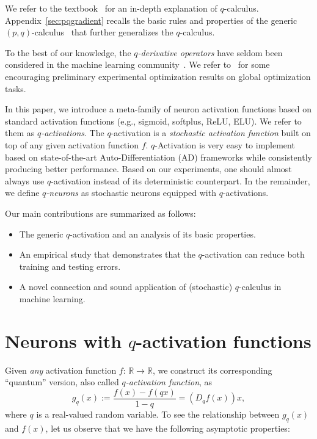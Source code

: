 \documentclass{article}
\def\bbR{\mathbb{R}}
\def\eqdef{:=}
\def\bbR{\mathbb{R}}
\begin{document}
We refer to the textbook~\cite{qbook-2001} for an in-depth explanation of $q$-calculus.
Appendix~\ref{sec:pqgradient} recalls the basic rules and properties of the generic
$(p,q)$-calculus~\cite{khan18} that further generalizes the $q$-calculus.

To the best of our knowledge, the {\em $q$-derivative operators} have seldom been considered in the machine learning community~\cite{xn-2018}.
We refer to~\cite{qGradOpt-2016} for some encouraging preliminary experimental optimization results on global optimization tasks.
 
In this paper, we introduce a meta-family of neuron activation functions based on standard activation functions (e.g., sigmoid, softplus, ReLU, ELU).
We refer to them as {\em $q$-activations}.
The $q$-activation is a {\em stochastic
activation function} built  on top of any given activation function $f$.
$q$-Activation is very easy to implement based on state-of-the-art Auto-Differentiation (AD)
frameworks while consistently producing better performance. Based on our
experiments, one should almost always use $q$-activation instead of its
deterministic counterpart. 
In the remainder, we define {\em $q$-neurons} as stochastic neurons equipped with $q$-activations.

Our main contributions are summarized as follows:
\begin{itemize}
\item The generic $q$-activation and an analysis of its basic properties.
\item An empirical study that demonstrates that the $q$-activation can reduce both training and testing errors.
\item A novel connection and sound application of (stochastic) $q$-calculus in machine learning.
\end{itemize}

\section{Neurons with $q$-activation functions}

Given {\em any} activation function $f:\,\bbR\to\bbR$, we construct its corresponding
``quantum'' version, also called \emph{$q$-activation function}, as
\begin{equation}\label{eq:qneuron}
g_q(x) \eqdef \frac{f(x)-f(qx)}{1-q} = \left(D_qf(x)\right) x,
\end{equation}
where $q$ is a real-valued random variable.
To see the relationship between $g_q(x)$ and $f(x)$, let us observe that we have the following asymptotic properties:
\end{document}
